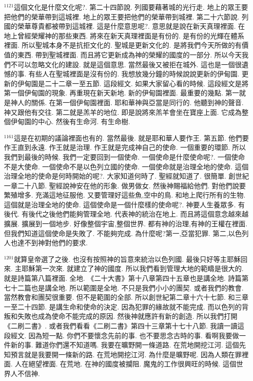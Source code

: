 \documentclass{book}
\begin{document}
$^{1121}$這個文化是什麼文化呢?.
第二十四節說.
列國要藉著城的光行走.
地上的眾王要把他們的榮華帶到這城裡.
地上的眾王要把他們的榮華帶到城裡.
第二十六節說.
列國的榮華尊貴都被帶到這城裡.
這是什麼意思呢?.
意思就是說在新天真理裡面.
在地上曾經榮耀神的那些東西.
將來在新天真理裡面是有份的.
是有份的光輝在體系裡面.
所以聖城本身不是抗拒文化的.
聖城是更新文化的.
是將我們今天所做的有價值的東西.
帶到聖城裡面.
而且將它更新成為神的榮耀的國度的一部分.
所以今天我們不可以忽略文化的建設.
就是這個意思.
當然最後又被拒在城外.
這也是一個很遺憾的事.
有些人在聖城裡面是沒有份的.
我想放幾分鐘的時候說說更新的伊甸園.
更新的伊甸園是二十二章一至五節.
這段經文.
如果大家留心看的時候.
這段經文是將第一個伊甸園的現象.
再重現在新天新地.
新的伊甸園裡面.
最重要的幾點.
第一就是神人的關係.
在第一個伊甸園裡面.
耶和華神與亞當是同行的.
他聽到神的聲音.
神又跟他有交往.
第二就是羔羊的地位.
即是說將來羔羊會坐在寶座上面.
它成為整個伊甸園的中心.
然後有生命河.
有生命樹.

$^{1161}$這是在初期的議論裡面也有的.
當然最後.
就是耶和華人要作王.
第五節.
他們要作王直到永遠.
作王就是治理.
作王就是完成神自己的使命.
一個重要的環節.
所以我們到最後的時候.
我們一定要回到一個使命.
一個使命是什麼使命呢?.
一個使命不是大使命.
一個使命不是以色列立國的使命.
一個使命就是治理全地的使命.
這個治理全地的使命是何時開始的呢?.
大家知道何時了.
聖經就知道了.
很簡單.
創世紀一章二十八節.
聖經說神安在他的形象.
做男做女.
然後神賜福給他們.
對他們說要繁殖增多.
充滿這地征服他.
又要管理好這些魚,空中的鳥.
和地上爬行所有的生物.
這個就是治理全地的使命.
這個使命是一個什麼樣的使命呢?.
神要人生養眾多.
有後代.
有後代之後他們能夠管理全地.
代表神的統治在地上.
而且將這個意念越來越擴展.
擴展到一個地步.
好像整個宇宙,整個世界.
都有神的治理,有神的王權在裡面.
但我們知道這個使命是失敗了.
不能夠完成.
為什麼呢?第一,亞當犯罪.
第二,以色列人也達不到神對他們的要求.

$^{1201}$就算皇帝選了之後.
也沒有按照神的旨意來統治以色列國.
最後只好等主耶穌回來.
主耶穌第一次來.
就建立了神的國度.
所以我們看到管理大地的範疇是很大的.
就是詩篇第八篇裡面.
全地.
《二十大書》第十八章第四十五章也是講全地.
詩篇第七十二篇也是講全地.
所以範圍是全地.
不只是我們小小的團契.
或者我們的教會.
當然教會和團契很重要.
但不是範圍的全部.
所以創世紀第二章十六十七節.
和三章一至二十四節.
是講生命和使命的決定.
因為犯罪的緣故就不能完成.
而以色列的背叛和失敗也成為使命不能完成的原因.
然後神就應許有新的創造.
所以我們打開《二刷二書》.
或者我們看看《二刷二書》第四十三章第十七十八節.
我讀一讀這段經文.
因為短一點.
你們不要懷念先前的事.
也不要思念古時的事.
看啊我要做一件新的事.
難道你們還不知道嗎.
我要在曠野開一條道路.
在荒地開挖江河.
這個先知預言就是我要開一條新的路.
在荒地開挖江河.
為什麼是曠野呢.
因為人類在罪裡面.
人在絕望裡面.
在荒地.
在神的國度被攔阻.
魔鬼的工作很興旺的時候.
這個世界人不信神.
\end{document}
